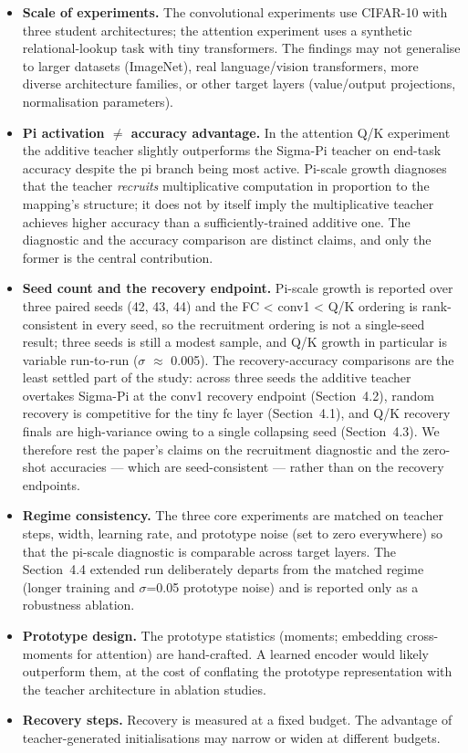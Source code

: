 \documentclass{article}
\providecommand{\tightlist}{%
  \setlength{\itemsep}{0pt}\setlength{\parskip}{0pt}}
\begin{document}
\begin{itemize}
\tightlist
\item
  \textbf{Scale of experiments.} The convolutional experiments use CIFAR-10 with three student architectures; the attention experiment uses a synthetic relational-lookup task with tiny transformers. The findings may not generalise to larger datasets (ImageNet), real language/vision transformers, more diverse architecture families, or other target layers (value/output projections, normalisation parameters).
\item
  \textbf{Pi activation $\neq$ accuracy advantage.} In the attention Q/K experiment the additive teacher slightly outperforms the Sigma-Pi teacher on end-task accuracy despite the pi branch being most active. Pi-scale growth diagnoses that the teacher \emph{recruits} multiplicative computation in proportion to the mapping's structure; it does not by itself imply the multiplicative teacher achieves higher accuracy than a sufficiently-trained additive one. The diagnostic and the accuracy comparison are distinct claims, and only the former is the central contribution.
\item
  \textbf{Seed count and the recovery endpoint.} Pi-scale growth is reported over three paired seeds (42, 43, 44) and the FC \textless{} conv1 \textless{} Q/K ordering is rank-consistent in every seed, so the recruitment ordering is not a single-seed result; three seeds is still a modest sample, and Q/K growth in particular is variable run-to-run ($\sigma$ $\approx$ 0.005). The recovery-accuracy comparisons are the least settled part of the study: across three seeds the additive teacher overtakes Sigma-Pi at the conv1 recovery endpoint (Section~4.2), random recovery is competitive for the tiny fc layer (Section~4.1), and Q/K recovery finals are high-variance owing to a single collapsing seed (Section~4.3). We therefore rest the paper's claims on the recruitment diagnostic and the zero-shot accuracies --- which are seed-consistent --- rather than on the recovery endpoints.
\item
  \textbf{Regime consistency.} The three core experiments are matched on teacher steps, width, learning rate, and prototype noise (set to zero everywhere) so that the pi-scale diagnostic is comparable across target layers. The Section~4.4 extended run deliberately departs from the matched regime (longer training and $\sigma$=0.05 prototype noise) and is reported only as a robustness ablation.
\item
  \textbf{Prototype design.} The prototype statistics (moments; embedding cross-moments for attention) are hand-crafted. A learned encoder would likely outperform them, at the cost of conflating the prototype representation with the teacher architecture in ablation studies.
\item
  \textbf{Recovery steps.} Recovery is measured at a fixed budget. The advantage of teacher-generated initialisations may narrow or widen at different budgets.
\end{itemize}
\end{document}
